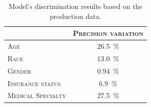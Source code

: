 \documentclass[a4paper,11pt]{article}
\begin{document}
\begin{table}[htb]
\caption{Model's discrimination results based on the production data.}
\label{tab:model_discrimination}
\centering
\begin{tabularx}{0.75\textwidth}{Xc}
\toprule
 & \textsc{Precision variation}  \\
\midrule
\textsc{Age} & \SI{26.5}{\percent} \\
\textsc{Race} & \SI{13.0}{\percent} \\
\textsc{Gender} & \SI{0.94}{\percent} \\
\textsc{Insurance status} & \SI{6.9}{\percent} \\
\textsc{Medical Specialty} & \SI{27.5}{\percent} \\
\bottomrule
\end{tabularx}
\end{table}










\end{document}
